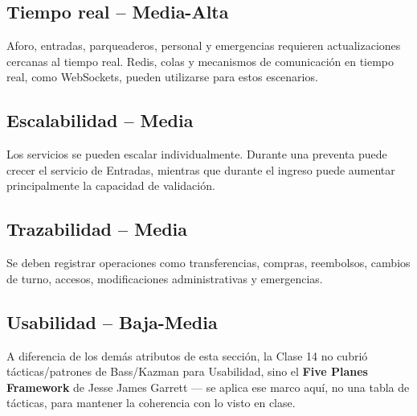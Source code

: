 \documentclass[12pt,a4paper]{article}
\begin{document}
\subsection{Tiempo real -- Media-Alta}

Aforo, entradas, parqueaderos, personal y emergencias requieren actualizaciones cercanas al tiempo real. Redis, colas y mecanismos de comunicación en tiempo real, como WebSockets, pueden utilizarse para estos escenarios.

\subsection{Escalabilidad -- Media}

Los servicios se pueden escalar individualmente. Durante una preventa puede crecer el servicio de Entradas, mientras que durante el ingreso puede aumentar principalmente la capacidad de validación.

\subsection{Trazabilidad -- Media}

Se deben registrar operaciones como transferencias, compras, reembolsos, cambios de turno, accesos, modificaciones administrativas y emergencias.

\subsection{Usabilidad -- Baja-Media}

A diferencia de los demás atributos de esta sección, la Clase 14 no cubrió tácticas/patrones de
Bass/Kazman para Usabilidad, sino el \textbf{Five Planes Framework} de Jesse James Garrett — se
aplica ese marco aquí, no una tabla de tácticas, para mantener la coherencia con lo visto en clase.
\end{document}
